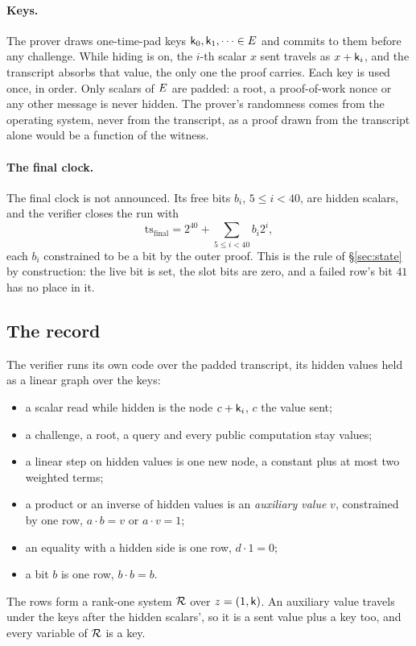 \paragraph{Keys.} The prover draws one-time-pad keys $\mathsf{k}_0, \mathsf{k}_1, \dots \in E$ and commits to them before any challenge. While hiding is on, the $i$-th scalar $x$ sent travels as $x + \mathsf{k}_i$, and the transcript absorbs that value, the only one the proof carries. Each key is used once, in order. Only scalars of $E$ are padded: a root, a proof-of-work nonce or any other message is never hidden. The prover's randomness comes from the operating system, never from the transcript, as a proof drawn from the transcript alone would be a function of the witness.

\paragraph{The final clock.} The final clock is not announced. Its free bits $b_i$, $5 \le i < 40$, are hidden scalars, and the verifier closes the run with
\[
\mathrm{ts}_{\mathrm{final}} = 2^{40} + \sum_{5 \le i < 40} b_i 2^i,
\]
each $b_i$ constrained to be a bit by the outer proof. This is the rule of \S\ref{sec:state} by construction: the live bit is set, the slot bits are zero, and a failed row's bit $41$ has no place in it.

\subsection{The record}\label{zk:record}

The verifier runs its own code over the padded transcript, its hidden values held as a linear graph over the keys:
\begin{itemize}[itemsep=1pt,topsep=2pt]
\item a scalar read while hidden is the node $c + \mathsf{k}_i$, $c$ the value sent;
\item a challenge, a root, a query and every public computation stay values;
\item a linear step on hidden values is one new node, a constant plus at most two weighted terms;
\item a product or an inverse of hidden values is an \emph{auxiliary value} $v$, constrained by one row, $a \cdot b = v$ or $a \cdot v = 1$;
\item an equality with a hidden side is one row, $d \cdot 1 = 0$;
\item a bit $b$ is one row, $b \cdot b = b$.
\end{itemize}
The rows form a rank-one system $\mathcal{R}$ over $z = (1, \mathsf{k})$. An auxiliary value travels under the keys after the hidden scalars', so it is a sent value plus a key too, and every variable of $\mathcal{R}$ is a key.


